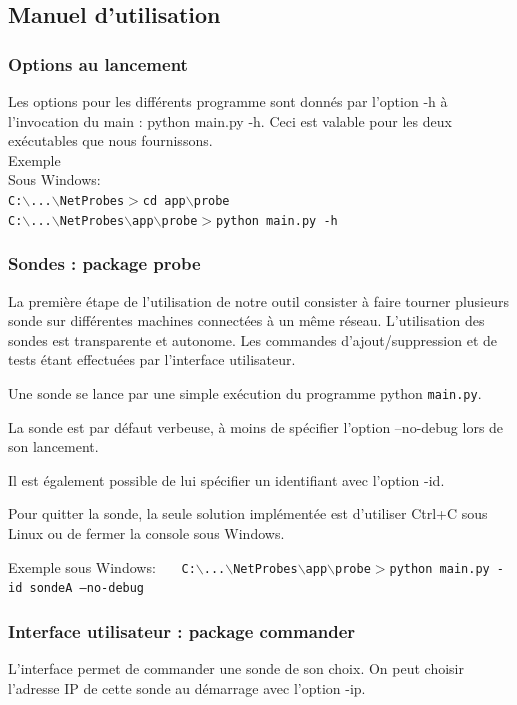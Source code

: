 \documentclass[a4paper,11pt]{article}
\begin{document}
\subsection{Manuel d'utilisation}

\subsubsection{Options au lancement}
Les options pour les différents programme sont donnés par l'option -h à l'invocation du main : python main.py -h.
Ceci est valable pour les deux exécutables que nous fournissons.\\
Exemple\\
Sous Windows:\\
\texttt{{\color{blue}C:$\backslash$...$\backslash$NetProbes$>$}cd app$\backslash$probe}\\
\texttt{{\color{blue}C:$\backslash$...$\backslash$NetProbes$\backslash$app$\backslash$probe$>$}python main.py -h}

\subsubsection{Sondes : package probe}
La première étape de l'utilisation de notre outil consister à faire tourner plusieurs sonde sur différentes machines connectées à un même réseau. L'utilisation des sondes est transparente et autonome. Les commandes d'ajout/suppression et de tests étant effectuées par l'interface utilisateur.

Une sonde se lance par une simple exécution du programme python \texttt{main.py}.

La sonde est par défaut verbeuse, à moins de spécifier l'option --no-debug lors de son lancement.

Il est également possible de lui spécifier un identifiant avec l'option -id.

Pour quitter la sonde, la seule solution implémentée est d'utiliser Ctrl+C sous Linux ou de fermer la console sous Windows.

Exemple sous Windows: \ \ \ \texttt{{\color{blue}C:$\backslash$...$\backslash$NetProbes$\backslash$app$\backslash$probe$>$}python main.py -id sondeA ---no-debug}

\subsubsection{Interface utilisateur : package commander}
L'interface permet de commander une sonde de son choix. On peut choisir l'adresse IP de cette sonde au démarrage avec l'option -ip.
\end{document}
